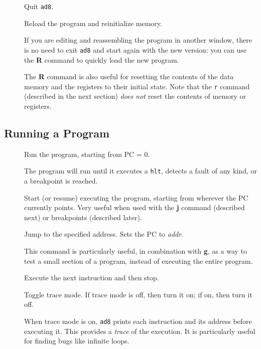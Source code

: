 \begin{description}
\item[\Large {}]

	Quit {\tt ad8}. 

\item[\Large {}]

	Reload the program and reinitialize memory.

	If you are editing and reassembling the program in another
	window, there is no need to exit {\tt ad8} and start again
	with the new version:  you can use the {\bf R} command to
	quickly load the new program.

	The {\bf R} command is also useful for resetting the
	contents of the data memory and the registers to their
	initial state.  Note that the {\tt r} command
	(described in the next section) {\em does not}
	reset the contents of memory or registers.

\end{description}

\subsection{Running a Program}

\begin{description}

\item[\Large {}]

	Run the program, starting from PC = 0.

	The program will run until it executes a {\tt hlt}, detects a
	fault of any kind, or a breakpoint is reached.

\item[\Large {}]

	Start (or resume) executing the program, starting from
	wherever the PC currently points.  Very useful when
	used with the {\bf j} command (described next) or
	breakpoints (described later).

\item[\Large {}]

	Jump to the specified address.  Sets the PC to
	{\em addr}.

	This command is particularly useful, in combination
	with {\bf g}, as a way to test a small section of a
	program, instead of executing the entire program.

\item[\Large {}]

	Execute the next instruction and then stop.

\item[\Large {}]

	Toggle trace mode.  If trace mode is off, then turn it
	on; if on, then turn it off.

	When trace mode is on, {\tt ad8} prints each
	instruction and its address before executing it.
	This provides a {\em trace} of the execution.
	It is particularly useful for finding bugs like
	infinite loops.

\end{description}

